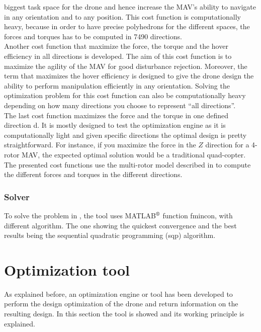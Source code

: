 biggest task space for the drone and hence increase the MAV’s ability to navigate
in any orientation and to any position. This cost function is computationally heavy,
because in order to have precise polyhedrons for the different spaces, the forces and
torques has to be computed in 7490 directions.\\
Another cost function that maximize the force, the torque and the hover
efficiency in all directions is developed. The aim of this cost function
is to maximize the agility of the MAV for good disturbance rejection. Moreover,
the term that maximizes the hover efficiency is designed to give the drone design
the ability to perform manipulation efficiently in any orientation. Solving the
optimization problem for this cost function can also be computationally heavy
depending on how many directions you choose to represent “all directions”.\\
The last cost function maximizes the force and the torque in one defined
direction d. It is mostly designed to test the optimization engine as it is
computationally light and given specific directions the optimal design is
pretty straightforward. For instance, if you maximize the force in the $Z$
direction for a 4-rotor MAV, the expected optimal solution would be a traditional
quad-copter.
The presented cost functions use the multi-rotor model described in
 to compute the different forces and torques in the
different directions.

\subsubsection{Solver}
\label{sec:solver}
To solve the problem in , the tool uses
MATLAB$^\textrm{\textregistered}$ function fmincon, with different algorithm.
The one showing the quickest convergence and the best results being the sequential
quadratic programming (sqp) algorithm.

\section{Optimization tool}
\label{sec:optimization_tool}
As explained before, an optimization engine or tool has been developed to perform
the design optimization of the drone and return information on the resulting design.
In this section the tool is showed and its working principle is explained.
